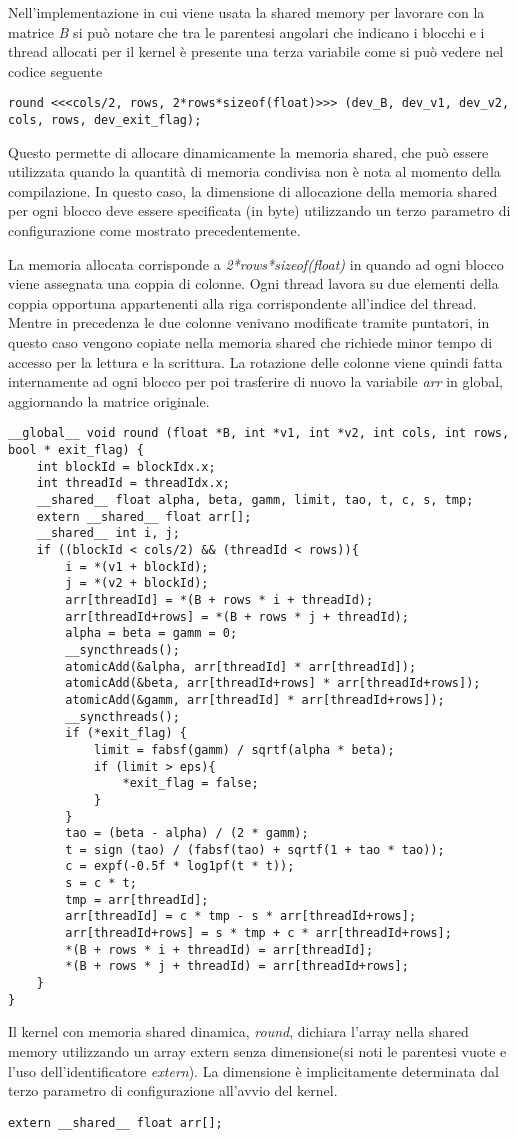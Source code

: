 \label{sec:Shared}
Nell'implementazione in cui viene usata la shared memory per lavorare con la matrice \textit{B} si può notare che tra le parentesi angolari che indicano i blocchi e i thread allocati per il kernel è presente una terza variabile come si può vedere nel codice seguente
\begin{lstlisting}
round <<<cols/2, rows, 2*rows*sizeof(float)>>> (dev_B, dev_v1, dev_v2, cols, rows, dev_exit_flag);
\end{lstlisting}
Questo permette di allocare dinamicamente la memoria shared, che può essere utilizzata quando la quantità di memoria condivisa non è nota al momento della compilazione. In questo caso, la dimensione di allocazione della memoria shared per ogni blocco deve essere specificata (in byte) utilizzando un terzo parametro di configurazione come mostrato precedentemente.

La memoria allocata corrisponde a \textit{2*rows*sizeof(float)} in quando ad ogni blocco viene assegnata una coppia di colonne. Ogni thread lavora su due elementi della coppia opportuna appartenenti alla riga corrispondente all'indice del thread.
Mentre in precedenza le due colonne venivano modificate tramite puntatori, in questo caso vengono copiate nella memoria shared che richiede minor tempo di accesso per la lettura e la scrittura. La rotazione delle colonne viene quindi fatta internamente ad ogni blocco per poi trasferire di nuovo la variabile \textit{arr} in global, aggiornando la matrice originale.
\begin{lstlisting}
__global__ void round (float *B, int *v1, int *v2, int cols, int rows, bool * exit_flag) {
	int blockId = blockIdx.x;
	int threadId = threadIdx.x;
	__shared__ float alpha, beta, gamm, limit, tao, t, c, s, tmp;
	extern __shared__ float arr[];
	__shared__ int i, j;
	if ((blockId < cols/2) && (threadId < rows)){
		i = *(v1 + blockId);
		j = *(v2 + blockId);
		arr[threadId] = *(B + rows * i + threadId);
		arr[threadId+rows] = *(B + rows * j + threadId);
		alpha = beta = gamm = 0;
		__syncthreads();
		atomicAdd(&alpha, arr[threadId] * arr[threadId]);
		atomicAdd(&beta, arr[threadId+rows] * arr[threadId+rows]);	
		atomicAdd(&gamm, arr[threadId] * arr[threadId+rows]);
		__syncthreads();
		if (*exit_flag) {
			limit = fabsf(gamm) / sqrtf(alpha * beta);
			if (limit > eps){
				*exit_flag = false;
			}
		}
		tao = (beta - alpha) / (2 * gamm);
		t = sign (tao) / (fabsf(tao) + sqrtf(1 + tao * tao)); 
		c = expf(-0.5f * log1pf(t * t));
		s = c * t;
		tmp = arr[threadId];
		arr[threadId] = c * tmp - s * arr[threadId+rows];
		arr[threadId+rows] = s * tmp + c * arr[threadId+rows];
		*(B + rows * i + threadId) = arr[threadId];
		*(B + rows * j + threadId) = arr[threadId+rows];
	}
}
\end{lstlisting}
Il kernel con memoria shared dinamica, \textit{round}, dichiara l'array nella shared memory utilizzando un array extern senza dimensione(si noti le parentesi vuote e l'uso dell'identificatore \textit{extern}). La dimensione è implicitamente determinata dal terzo parametro di configurazione all'avvio del kernel.
\begin{lstlisting}
extern __shared__ float arr[];
\end{lstlisting}